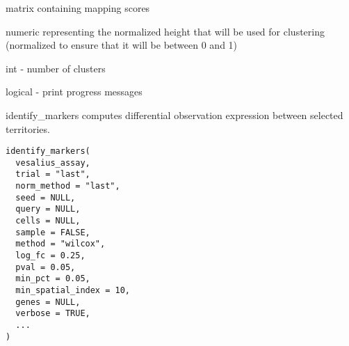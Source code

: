 \documentclass[a4paper]{book}
\begin{document}
\begin{Arguments}
\begin{ldescription}
\item[\code{score}] matrix containing mapping scores

\item[\code{h}] numeric representing the normalized height that will be 
used for clustering (normalized to ensure that it will be between 0 and 1)

\item[\code{k}] int - number of clusters

\item[\code{verbose}] logical - print progress messages
\end{ldescription}
\end{Arguments}
%
\begin{Description}
identify\_markers computes differential observation expression 
between selected territories.
\end{Description}
%
\begin{Usage}
\begin{verbatim}
identify_markers(
  vesalius_assay,
  trial = "last",
  norm_method = "last",
  seed = NULL,
  query = NULL,
  cells = NULL,
  sample = FALSE,
  method = "wilcox",
  log_fc = 0.25,
  pval = 0.05,
  min_pct = 0.05,
  min_spatial_index = 10,
  genes = NULL,
  verbose = TRUE,
  ...
)
\end{verbatim}
\end{Usage}
%
\end{document}
